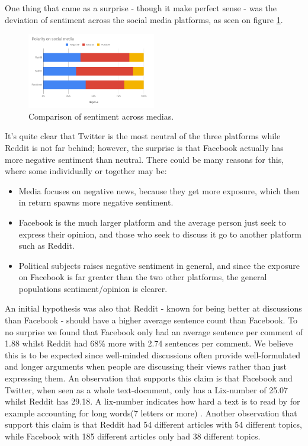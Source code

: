 One thing that came as a surprise - though it make perfect sense - was the deviation of sentiment across the social media platforms, as seen on figure \ref{platforms}.

\begin{figure}[H]
	\includegraphics[width=0.5\textwidth]{Images/PlatformsCompared}
	\centering
	\caption{Comparison of sentiment across medias.}
	\label{platforms}
\end{figure}

It’s quite clear that Twitter is the most neutral of the three platforms while Reddit is not far behind; however, the surprise is that Facebook actually has more negative sentiment than neutral. There could be many reasons for this, where some individually or together may be: 
\begin{itemize}
	\item Media focuses on negative news, because they get more exposure, which then in return spawns more negative sentiment.
	\item Facebook is the much larger platform and the average person just seek to express their opinion, and those who seek to discuss it go to another platform such as Reddit.
	\item Political subjects raises negative sentiment in general, and since the exposure on Facebook is far greater than the two other platforms, the general populations sentiment/opinion is clearer.
\end{itemize}

An initial hypothesis was also that Reddit - known for being better at discussions than Facebook - should have a higher average sentence count than Facebook. To no surprise we found that Facebook only had an average sentence per comment of 1.88 whilst Reddit had 68\% more with 2.74 sentences per comment. We believe this is to be expected since well-minded discussions often provide well-formulated and longer arguments when people are discussing their views rather than just expressing them. An observation that supports this claim is that Facebook and Twitter, when seen as a whole text-document, only has a Lix-number of 25.07 whilst Reddit has 29.18. A lix-number indicates how hard a text is to read by for example accounting for long words(7 letters or more) \cite{lix}. Another observation that support this claim is that Reddit had 54 different articles with 54 different topics, while Facebook with 185 different articles only had 38 different topics.


